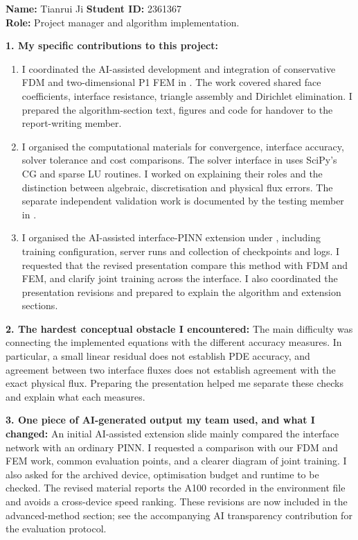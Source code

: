 \begin{formbox}
\textbf{Name:} Tianrui Ji \hfill \textbf{Student ID:} 2361367\\
\textbf{Role:} Project manager and algorithm implementation.

\textbf{1. My specific contributions to this project:}
\begin{enumerate}[leftmargin=2em,itemsep=0.25em,topsep=0.15em]
    \item I coordinated the AI-assisted development and integration of
    conservative FDM and two-dimensional P1 FEM in
    . The work covered
    shared face coefficients, interface resistance, triangle assembly and
    Dirichlet elimination. I prepared the algorithm-section text, figures
    and code for handover to the report-writing member.

    \item I organised the computational materials for convergence, interface
    accuracy, solver tolerance and cost comparisons. The solver interface in
     uses SciPy's CG and sparse
    LU routines. I worked on explaining their roles and the distinction
    between algebraic, discretisation and physical flux errors. The separate
    independent validation work is documented by the testing member in
    .

    \item I organised the AI-assisted interface-PINN extension under
    , including training configuration, server runs
    and collection of checkpoints and logs. I requested that the revised
    presentation compare this method with FDM and FEM, and clarify joint
    training across the interface. I also coordinated the presentation
    revisions and prepared to explain the algorithm and extension sections.
\end{enumerate}

\textbf{2. The hardest conceptual obstacle I encountered:}
The main difficulty was connecting the implemented equations with the
different accuracy measures. In particular, a small linear residual does
not establish PDE accuracy, and agreement between two interface fluxes
does not establish agreement with the exact physical flux. Preparing the
presentation helped me separate these checks and explain what each measures.

\textbf{3. One piece of AI-generated output my team used, and what I changed:}
An initial AI-assisted extension slide mainly compared the interface network
with an ordinary PINN. I requested a comparison with our FDM and FEM work,
common evaluation points, and a clearer diagram of joint training. I also
asked for the archived device, optimisation budget and runtime to be
checked. The revised material reports the A100 recorded in the environment
file and avoids a cross-device speed ranking. These revisions are now included in the advanced-method section; see
the accompanying AI transparency contribution for the evaluation protocol.


\end{formbox}
